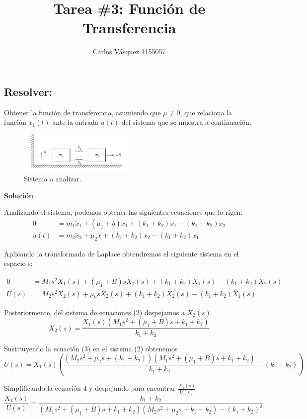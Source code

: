 \documentclass[letterpaper]{article}
\title{Tarea \#3: Función de Transferencia}
\author{Carlos Vásquez 1155057}
\begin{document}
\maketitle
\subsection*{Resolver:}
Obtener la función de transferencia, asumiendo que $\mu \neq 0$, que relaciona la función $x_1(t)$ ante la entrada $u(t)$ del sistema que se muestra a continuación.
\begin{figure}[H]
	\centering
	\includegraphics[width=0.5\textwidth]{sys.png}
	\caption{Sistema a analizar.}
\end{figure}
\textbf{Solución}

Analizando el sistema, podemos obtener las siguientes ecuaciones que lo rigen:
\begin{equation}
	\begin{split}
		0 &= m_1 \ddot x_1 + (\mu_1 + b)\dot x_1 + (k_1 + k_2)x_1 - (k_1 + k_2)x_2 \\
		u(t) &= m_2 \ddot x_2 + \mu_2 \dot x + (k_1 + k_2)x_2 - (k_1 + k_2)x_1
	\end{split}
\end{equation}

Aplicando la transformada de Laplace obtendremos el siguiente sistema en el espacio s:

\begin{equation}
	\begin{split}
		0 &= M_1 s^2 X_1(s) + (\mu_1 + B)s X_1(s) + (k_1 + k_2)X_1(s) - (k_1 + k_2)X_2(s) \\
		U(s) &= M_2 s^2 X_2(s) + \mu_2 sX_2(s) + (k_1 + k_2)X_2(s) - (k_1 + k_2)X_1(s)
	\end{split}
\end{equation}

Posteriormente, del sistema de ecuaciones (2) despejamos a $X_2(s)$
\begin{equation}
	X_2(s) = \frac{X_1(s)(M_1 s^2 + (\mu_1 + B)s + k_1 + k_2)}{k_1 + k_2}
\end{equation}

Sustituyendo la ecuación (3) en el sistema (2) obtenemos
\begin{equation}
	U(s) = X_1(s) \left(  \frac{(M_2s^2 + \mu_2s + (k_1 + k_2))(M_1s^2 + (\mu_1 + B)s + k_1 + k_2)}{k_1 + k_2} - (k_1 + k_2) \right)
\end{equation}

Simplificando la ecuación 4 y despejando para encontrar $\frac{X_1(s)}{U(s)}$
\begin{equation}
	\boxed{\frac{X_1(s)}{U(s)} = \frac{k_1 + k_2}{(M_1s^2 + (\mu_1 + B)s + k_1 + k_2)(M_2s^2 + \mu_2s + k_1 + k_2) - (k_1 + k_2)^2}}
\end{equation}
\renewcommand\refname{Referencias}
\printbibliography
\end{document}
